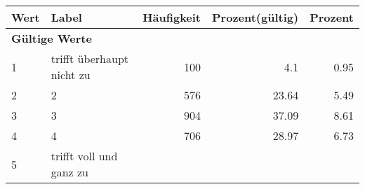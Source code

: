      \begin{longtable}{lXrrr}
     \toprule
     \textbf{Wert} & \textbf{Label} & \textbf{Häufigkeit} & \textbf{Prozent(gültig)} & \textbf{Prozent} \\
     \endhead
     \midrule
     \multicolumn{5}{l}{\textbf{Gültige Werte}}\\

     1 &
     \multicolumn{1}{X}{ trifft überhaupt nicht zu   } &


       \num{100} &
       \num[round-mode=places,round-precision=2]{4,1} &
         \num[round-mode=places,round-precision=2]{0,95} \\

     2 &
     \multicolumn{1}{X}{ 2   } &


       \num{576} &
       \num[round-mode=places,round-precision=2]{23,64} &
         \num[round-mode=places,round-precision=2]{5,49} \\

     3 &
     \multicolumn{1}{X}{ 3   } &


       \num{904} &
       \num[round-mode=places,round-precision=2]{37,09} &
         \num[round-mode=places,round-precision=2]{8,61} \\

     4 &
     \multicolumn{1}{X}{ 4   } &


       \num{706} &
       \num[round-mode=places,round-precision=2]{28,97} &
         \num[round-mode=places,round-precision=2]{6,73} \\

     5 &
     \multicolumn{1}{X}{ trifft voll und ganz zu   } &



\end{longtable}
